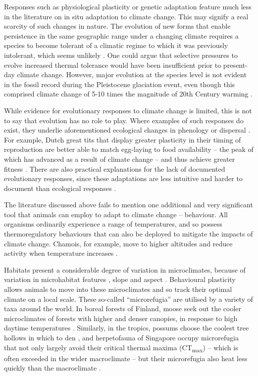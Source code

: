 \documentclass[12pt,a4paper,]{report}
\theoremstyle{definition}
\theoremstyle{definition}
\theoremstyle{definition}
\theoremstyle{remark}
\begin{document}
Responses such as physiological plasticity or genetic adaptation feature
much less in the literature on in situ adaptation to climate change.
This may signify a real scarcity of such changes in nature. The
evolution of new forms that enable persistence in the same geographic
range under a changing climate requires a species to become tolerant of
a climatic regime to which it was previously intolerant, which seems
unlikely \citep{parmesan_ecological_2006}. One could argue that
selective pressures to evolve increased thermal tolerance would have
been insufficient prior to present-day climate change. However, major
evolution at the species level is not evident in the fossil record
during the Pleistocene glaciation event, even though this comprised
climate change of 5-10 times the magnitude of 20th Century warming
\citep{parmesan_ecological_2006}.

While evidence for evolutionary responses to climate change is limited,
this is not to say that evolution has no role to play. Where examples of
such responses do exist, they underlie aforementioned ecological changes
in phenology or dispersal \citep{parmesan_ecological_2006}. For example,
Dutch great tits that display greater plasticity in their timing of
reproduction are better able to match egg-laying to food availability --
the peak of which has advanced as a result of climate change -- and thus
achieve greater fitness \citep{nussey_selection_2005}. There are also
practical explanations for the lack of documented evolutionary
responses, since these adaptations are less intuitive and harder to
document than ecological responses \citep{oconnor_toward_2012}.

The literature discussed above fails to mention one additional and very
significant tool that animals can employ to adapt to climate change --
behaviour. All organisms ordinarily experience a range of temperatures,
and so possess thermoregulatory behaviours that can also be deployed to
mitigate the impacts of climate change. Chamois, for example, move to
higher altitudes and reduce activity when temperature increases
\citep{mason_predicting_2014}.

Habitats present a considerable degree of variation in microclimates,
because of variation in microhabitat features
\citep{scheffers_microhabitats_2014}, slope and aspect
\citep{suggitt_habitat_2011}. Behavioural plasticity allows animals to
move into these microclimates \citep{scheffers_microhabitats_2014} and
so track their optimal climate on a local scale. These so-called
``microrefugia'' are utilised by a variety of taxa around the world. In
boreal forests of Finland, moose seek out the cooler microclimates of
forests with higher and denser canopies, in response to high daytime
temperatures \citep{melin_moose_2014}. Similarly, in the tropics,
possums choose the coolest tree hollows in which to den
\citep{isaac_microclimate_2008}, and herpetofauna of Singapore occupy
microrefugia that not only largely avoid their critical thermal maxima
(CT\textsubscript{max}) -- which is often exceeded in the wider
macroclimate -- but their microrefugia also heat less quickly than the
macroclimate \citep{scheffers_microhabitats_2014}.
\end{document}
